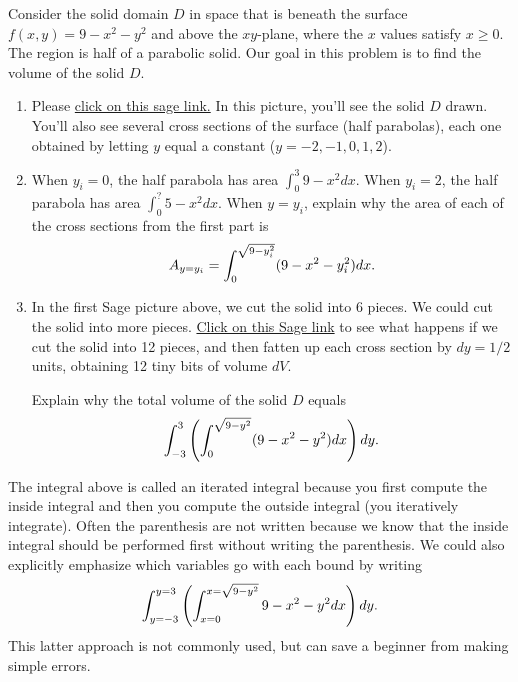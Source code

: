 \begin{problem}%
Consider the solid domain $D$ in space that is beneath the surface $f(x,y)=9-x^2-y^2$ and above the $xy$-plane, where the $x$ values satisfy $x\geq 0$.  The region is half of a parabolic solid.  Our goal in this problem is to find the volume of the solid $D$.
\begin{enumerate}
 \item Please \href{http://bmw.byuimath.com/dokuwiki/doku.php?id=cross_sections_of_solid_by_letting_y_equal_a_constant}{click on this sage link.} In this picture, you'll see the solid $D$ drawn.  You'll also see several cross sections of the surface (half parabolas), each one obtained by letting $y$ equal a constant ($y=-2, -1,0,1,2$).  
 \item  When $y_i=0$, the half parabola has area $\int_0^3 9-x^2dx$.  When $y_i=2$, the half parabola has area $\int_0^? 5-x^2dx$.
When $y=y_i$, explain why the area of each of the cross sections from the first part is $$A_{y=y_i}=\displaystyle \int_0^{\sqrt{9-y_i^2}} (9-x^2-y_i^2) dx.$$
 \item In the first Sage picture above, we cut the solid into 6 pieces. We could cut the solid into more pieces. \href{http://bmw.byuimath.com/dokuwiki/doku.php?id=cross_sections_multiplied_by_dy}{Click on this Sage link} to see what happens if we cut the solid into 12 pieces, and then fatten up each cross section by $dy=1/2$ units, obtaining 12 tiny bits of volume $dV$. 

Explain why the total volume of the solid $D$ equals $$\displaystyle\int_{-3}^{3} \left(\int_0^{\sqrt{9-y^2}}(9-x^2-y^2) dx\right) dy.$$
\end{enumerate}
\end{problem}

The integral above is called an iterated integral because you first compute the inside integral and then you compute the outside integral (you iteratively integrate). Often the parenthesis are not written because we know that the inside integral should be performed first without writing the parenthesis. We could also explicitly emphasize which variables go with each bound by writing
$$\displaystyle\int_{y=-3}^{y=3} \left(\int_{x=0}^{x=\sqrt{9-y^2}}9-x^2-y^2 dx\right) dy.$$   
This latter approach is not commonly used, but can save a beginner from making simple errors. 

